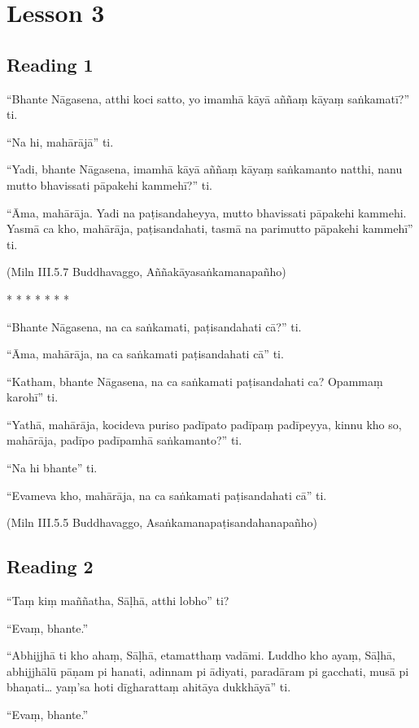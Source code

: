 \chapter{Lesson 3}

\section*{Reading 1}

“Bhante Nāgasena, atthi koci satto, yo imamhā kāyā aññaṃ kāyaṃ saṅkamatī?” ti.

“Na hi, mahārājā” ti.

“Yadi, bhante Nāgasena, imamhā kāyā aññaṃ kāyaṃ saṅkamanto natthi, nanu mutto bhavissati pāpakehi kammehī?” ti.

“Āma, mahārāja. Yadi na paṭisandaheyya, mutto bhavissati pāpakehi kammehi. Yasmā ca kho, mahārāja, paṭisandahati, tasmā na parimutto pāpakehi kammehī” ti.

(Miln III.5.7 Buddhavaggo, Aññakāyasaṅkamanapañho)

\begin{center}
    * * * * * * *
\end{center}

“Bhante Nāgasena, na ca saṅkamati, paṭisandahati cā?” ti.

“Āma, mahārāja, na ca saṅkamati paṭisandahati cā” ti.

“Katham, bhante Nāgasena, na ca saṅkamati paṭisandahati ca? Opammaṃ karohī” ti.

“Yathā, mahārāja, kocideva puriso padīpato padīpaṃ padīpeyya, kinnu kho so, mahārāja, padīpo padīpamhā saṅkamanto?” ti.

“Na hi bhante” ti.

“Evameva kho, mahārāja, na ca saṅkamati paṭisandahati cā” ti.

(Miln III.5.5 Buddhavaggo, Asaṅkamanapaṭisandahanapañho)

\section*{Reading 2}

“Taṃ kiṃ maññatha, Sāḷhā, atthi lobho” ti?

“Evaṃ, bhante.”

“Abhijjhā ti kho ahaṃ, Sāḷhā, etamatthaṃ vadāmi. Luddho kho ayaṃ, Sāḷhā, abhijjhālū pāṇam pi hanati, adinnam pi ādiyati, paradāram pi gacchati, musā pi bhaṇati… yaṃ’sa hoti dīgharattaṃ ahitāya dukkhāyā” ti.

“Evaṃ, bhante.”

